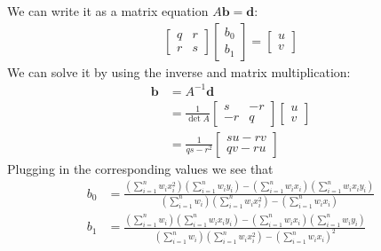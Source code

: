 \documentclass[12pt]{article}
\begin{document}
\begin{enumerate}
We can write it as a matrix equation $A\mathbf{b}=\mathbf{d}$:
\begin{align*}
	\begin{bmatrix}
		q  & r\\
		r & s
	\end{bmatrix}
	\begin{bmatrix}
		b_0\\
		b_1
	\end{bmatrix}
	=
	\begin{bmatrix}
		u\\
		v
	\end{bmatrix}
\end{align*}
We can solve it by using the inverse and matrix multiplication:
\begin{align*}
	\mathbf{b}&=A^{-1}\mathbf{d}\\
	&=\frac{1}{\det A}\begin{bmatrix}
		s & -r\\
		-r & q
	\end{bmatrix}
	\begin{bmatrix}
		u\\
		v
	\end{bmatrix}\\
	&=\frac{1}{qs-r^2}
	\begin{bmatrix}
		su-rv\\
		qv-ru
	\end{bmatrix}
\end{align*}
Plugging in the corresponding values we see that
\begin{align*}
	b_0 &= \frac{\left(\sum_{i=1}^{n}w_ix_i^2\right)\left(\sum_{i=1}^{n}w_iy_i\right)-\left(\sum_{i=1}^{n}w_ix_i\right)\left(\sum_{i=1}^{n}w_ix_iy_i\right)}
	{\left(\sum_{i=1}^{n}w_i\right)\left(\sum_{i=1}^{n}w_ix_i^2\right)-\left(\sum_{i=1}^{n}w_ix_i\right)}\\
	b_1 &= \frac{\left(\sum_{i=1}^{n}w_i\right)\left(\sum_{i=1}^{n}w_ix_iy_i\right)-\left(\sum_{i=1}^{n}w_ix_i\right)\left(\sum_{i=1}^{n}w_iy_i\right)}
	{\left(\sum_{i=1}^{n}w_i\right)\left(\sum_{i=1}^{n}w_ix_i^2\right)-\left(\sum_{i=1}^{n}w_ix_i\right)^2}
\end{align*}



\end{enumerate}
\end{document}
